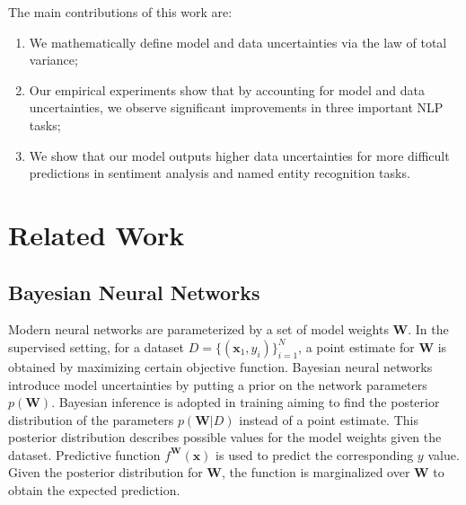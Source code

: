 \documentclass[letterpaper]{article} %
\newcommand{\vect}[1]{\mathbf{#1}}
\newcommand{\matr}[1]{\mathbf{#1}}
\newcommand{\vx}[0]{\vect{x}}
\newcommand{\mW}[0]{\matr{W}}
\newcommand{\william}[1]{\textcolor{blue}{[William: #1]}}
\begin{document}
The main contributions of this work are:
\begin{enumerate}
\item We mathematically define model and data uncertainties via the law of total variance;
\item Our empirical experiments show that by accounting for model and data uncertainties, we observe significant improvements in three important NLP tasks;
\item We show that our model outputs higher data uncertainties for more difficult predictions in sentiment analysis and named entity recognition tasks.
\end{enumerate}

\section{Related Work}

\subsection{Bayesian Neural Networks}
Modern neural networks are parameterized by a set of model weights $\mW$. In the supervised setting, for a dataset $D=\{(\vx_1,y_i)\}_{i=1}^N$, a point estimate for $\mW$ is obtained by maximizing certain objective function. Bayesian neural networks \cite{buntine1991bayesian,denker1991transforming,mackay1992practical,mackay1995probable,neal2012bayesian} introduce model uncertainties by putting a prior on the network parameters $p(\mW)$. Bayesian inference is adopted in training aiming to find the posterior distribution of the parameters $p(\mW|D)$ instead of a point estimate. This posterior distribution describes possible values for the model weights given the dataset. Predictive function $f^\mW(\vx)$ is used to predict the corresponding $y$ value. Given the posterior distribution for $\mW$, the function is marginalized over $\mW$ to obtain the expected prediction.
\end{document}
